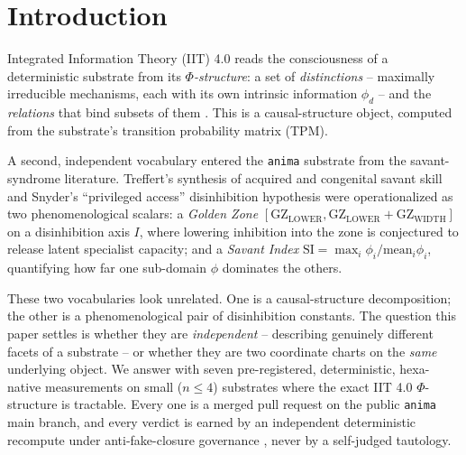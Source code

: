 \documentclass[11pt,a4paper]{article}
\newcommand{\GZL}{\mathrm{GZ_{LOWER}}}
\newcommand{\GZW}{\mathrm{GZ_{WIDTH}}}
\newcommand{\Svi}{\mathrm{SI}}
\begin{document}
\section{Introduction}
\label{sec:intro}

Integrated Information Theory (IIT) 4.0 reads the consciousness of a
deterministic substrate from its \emph{$\Phi$-structure}: a set of
\emph{distinctions} -- maximally irreducible mechanisms, each with its own
intrinsic information $\phi_d$ -- and the \emph{relations} that bind
subsets of them \citep{albantakis2023iit4,oizumi2014phenomenology}. This
is a causal-structure object, computed from the substrate's transition
probability matrix (TPM).

A second, independent vocabulary entered the \texttt{anima} substrate from
the savant-syndrome literature. Treffert's synthesis of acquired and
congenital savant skill \citep{treffert2009savant} and Snyder's
``privileged access'' disinhibition hypothesis \citep{snyder2009explaining}
were operationalized as two phenomenological scalars: a \emph{Golden Zone}
$[\GZL, \GZL+\GZW]$ on a disinhibition axis $I$, where lowering inhibition
into the zone is conjectured to release latent specialist capacity; and a
\emph{Savant Index} $\Svi = \max_i \phi_i / \mathrm{mean}_i \phi_i$,
quantifying how far one sub-domain $\phi$ dominates the others.

These two vocabularies look unrelated. One is a causal-structure
decomposition; the other is a phenomenological pair of disinhibition
constants. The question this paper settles is whether they are
\emph{independent} -- describing genuinely different facets of a substrate
-- or whether they are two coordinate charts on the \emph{same} underlying
object. We answer with seven pre-registered, deterministic, hexa-native
measurements on small ($n\!\le\!4$) substrates where the exact IIT 4.0
$\Phi$-structure is tractable. Every one is a merged pull request on the
public \texttt{anima} main branch, and every verdict is earned by an
independent deterministic recompute under anti-fake-closure governance
\citep{anima_g73}, never by a self-judged tautology.
\end{document}
